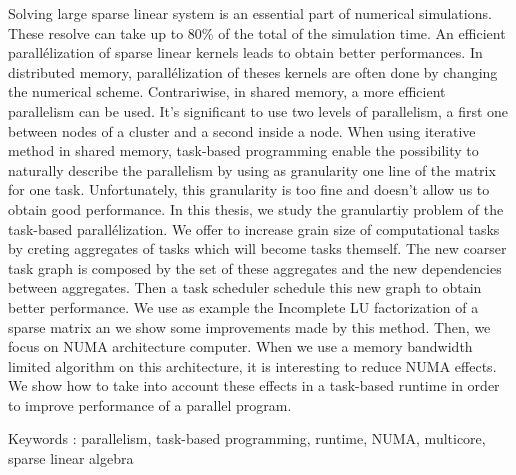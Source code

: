 Solving large sparse linear system is an essential part of numerical simulations. These resolve can take up to 80\% of the total of the simulation time.
An efficient parallélization of sparse linear kernels leads to obtain better performances. In distributed memory, parallélization of theses kernels are often done by changing the numerical scheme. Contrariwise, in shared memory, a more efficient parallelism can be used. It's significant to use two levels of parallelism, a first one between nodes of a cluster and a second inside a node.
When using iterative method in shared memory, task-based programming enable the possibility to naturally describe the parallelism by using as granularity one line of the matrix for one task. Unfortunately, this granularity is too fine and doesn't allow us to obtain good performance.
In this thesis, we study the granulartiy problem of the task-based parallélization. We offer to increase grain size of computational tasks by creting aggregates of tasks which will become tasks themself. The new coarser task graph is composed by the set of these aggregates and the new dependencies between aggregates. Then a task scheduler schedule this new graph to obtain better performance. We use as example the Incomplete LU factorization of a sparse matrix an we show some improvements made by this method. Then, we focus on NUMA architecture computer. When we use a memory bandwidth limited algorithm on this architecture, it is interesting to reduce NUMA effects. We show how to take into account these effects in a task-based runtime in order to improve performance of a parallel program.

Keywords : parallelism, task-based programming, runtime, NUMA, multicore, sparse linear algebra
